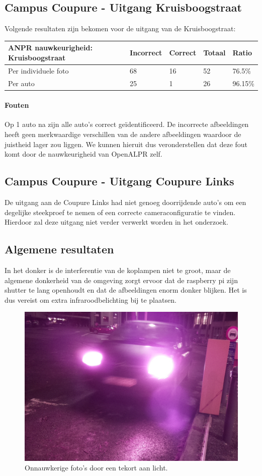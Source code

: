 \subsection{Campus Coupure - Uitgang Kruisboogstraat}

Volgende resultaten zijn bekomen voor de uitgang van de Kruisboogstraat:

\begin{table}[h!]
	\centering
	\begin{tabular}{l|l|l|l|l}
		\textbf{ANPR nauwkeurigheid: Kruisboogstraat} & Incorrect & Correct & Totaal & Ratio	\\ \hline
		Per individuele foto 	& 68 & 16	& 52	& 76.5\%\\
		Per auto				& 25 & 1	& 26 	& 96.15\%\\
	\end{tabular}
	\label{ResultatenKruisboog}
\end{table}

\paragraph{Fouten}
Op 1 auto na zijn alle auto's correct geïdentificeerd. De incorrecte afbeeldingen heeft geen merkwaardige verschillen van de andere afbeeldingen waardoor de juistheid lager zou liggen. We kunnen hieruit dus veronderstellen dat deze fout komt door de nauwkeurigheid van OpenALPR zelf.

\subsection{Campus Coupure - Uitgang Coupure Links}
De uitgang aan de Coupure Links had niet genoeg doorrijdende auto's om een degelijke steekproef te nemen of een correcte cameraconfiguratie te vinden. Hierdoor zal deze uitgang niet verder verwerkt worden in het onderzoek.

\subsection{Algemene resultaten}
In het donker is de interferentie van de koplampen niet te groot, maar de algemene donkerheid van de omgeving zorgt ervoor dat de raspberry pi zijn shutter te lang openhoudt en dat de afbeeldingen enorm donker blijken. Het is dus vereist om extra infraroodbelichting bij te plaatsen.
\begin{figure}[h!]
	\centering
	\includegraphics[width=0.5\linewidth]{img/nacht-coupure.jpg}
	\caption{Onnauwkerige foto's door een tekort aan licht.}
	\label{SterreDonker}
\end{figure}

